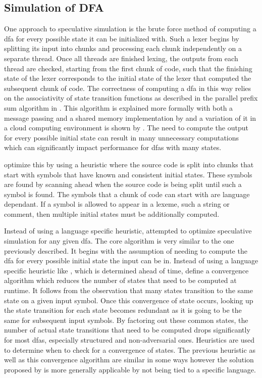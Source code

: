 \subsection{Simulation of DFA} \label{simulation_of_dfa}

One approach to speculative simulation is the brute force method of computing
a \gls{dfa} for every possible state it can be initialized with. Such a
lexer begins by splitting its input into chunks and processing each chunk
independently on a separate thread. Once all threads are finished lexing,
the outputs from each thread are checked, starting from the first chunk of
code, such that the finishing state of the lexer corresponds to the initial
state of the lexer that computed the subsequent chunk of code. The correctness
of computing a \gls{dfa} in this way relies on the  associativity of state
transition functions as described in the parallel prefix sum algorithm in
\cite{hillis_data_1986}. This algorithm is explained more formally with both a
message passing and a shared memory implementation by \cite{holub_parallel_2009}
and a variation of it in a cloud computing environment is shown by
\cite{ko_speculative_2012}. The need to compute the output for every possible
initial state can result in many unnecessary computations which can
significantly impact performance for \glspl{dfa} with many states.

\cite{barenghi_parallel_2015} optimize this by using a heuristic where the
source code is split into chunks that start with symbols that have known and
consistent initial states. These symbols are found by scanning ahead when the
source code is being split until such a symbol is found. The symbols that a
chunk of code can start with are language dependant. If a symbol is allowed to
appear in a lexeme, such a string or comment, then multiple initial states must
be additionally computed.

Instead of using a language specific heuristic,
\cite{mytkowicz_data-parallel_2014} attempted to optimize speculative simulation for
any given \gls{dfa}. The core algorithm is very similar to the one previously
described. It begins with the assumption of needing to compute the \gls{dfa} for
every possible initial state the input can be in. Instead of using a language
specific heuristic like \cite{barenghi_parallel_2015}, which is determined ahead
of time, \cite{mytkowicz_data-parallel_2014} define a convergence algorithm
which reduces the number of states that need to be computed at runtime. It
follows from the observation that many states transition to the same state on
a given input symbol. Once this convergence of state occurs, looking up the
state transition for each state becomes redundant as it is going to be the same
for subsequent input symbols. By factoring out these common states, the number
of actual state transitions that need to be computed drops significantly for
most \gls{dfa}s, especially structured and non-adversarial ones. Heuristics
are used to determine when to check for a  convergence of states. The previous
heuristic as well as this convergence algorithm are similar in some ways however
the solution proposed by \cite{mytkowicz_data-parallel_2014} is more generally
applicable by not being tied to a specific language.

